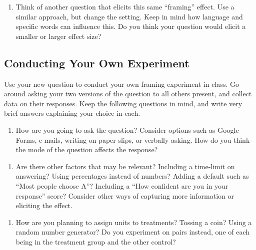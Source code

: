 \documentclass[
  letterpaper,
  DIV=11,
  numbers=noendperiod]{scrartcl}
\providecommand{\tightlist}{%
  \setlength{\itemsep}{0pt}\setlength{\parskip}{0pt}}
\begin{document}
\begin{enumerate}
\def\labelenumi{\arabic{enumi}.}
\setcounter{enumi}{1}
\tightlist
\item
  Think of another question that elicits this same ``framing'' effect.
  Use a similar approach, but change the setting. Keep in mind how
  language and specific words can influence this. Do you think your
  question would elicit a smaller or larger effect size?
\end{enumerate}

\hfill\break
\hfill\break
\hfill\break
\hfill\break
\hfill\break
\hfill\break
\hfill\break
\hfill\break
\hfill\break
\hfill\break

\subsection{Conducting Your Own
Experiment}\label{conducting-your-own-experiment}

Use your new question to conduct your own framing experiment in class.
Go around asking your two versions of the question to all others
present, and collect data on their responses. Keep the following
questions in mind, and write very brief answers explaining your choice
in each.

\begin{enumerate}
\def\labelenumi{\arabic{enumi}.}
\setcounter{enumi}{2}
\tightlist
\item
  How are you going to ask the question? Consider options such as Google
  Forms, e-mails, writing on paper slips, or verbally asking. How do you
  think the mode of the question affects the response?
\end{enumerate}

\hfill\break
\hfill\break
\hfill\break
\hfill\break
\hfill\break
\hfill\break

\begin{enumerate}
\def\labelenumi{\arabic{enumi}.}
\setcounter{enumi}{3}
\tightlist
\item
  Are there other factors that may be relevant? Including a time-limit
  on answering? Using percentages instead of numbers? Adding a default
  such as ``Most people choose A''? Including a ``How confident are you
  in your response'' score? Consider other ways of capturing more
  information or eliciting the effect.
\end{enumerate}

\hfill\break
\hfill\break
\hfill\break
\hfill\break
\hfill\break
\hfill\break

\begin{enumerate}
\def\labelenumi{\arabic{enumi}.}
\setcounter{enumi}{4}
\tightlist
\item
  How are you planning to assign units to treatments? Tossing a coin?
  Using a random number generator? Do you experiment on pairs instead,
  one of each being in the treatment group and the other control?
\end{enumerate}
\end{document}
